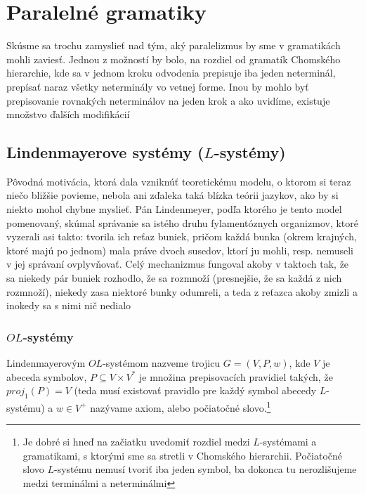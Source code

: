 \chapter{Paralelné gramatiky}

Skúsme sa trochu zamyslieť nad tým, aký paralelizmus by sme v
gramatikách mohli zaviesť. Jednou z možností by bolo, na rozdiel
od gramatík Chomského hierarchie, kde sa v jednom kroku odvodenia
prepisuje iba jeden neterminál, prepísať naraz všetky neterminály
vo vetnej forme. Inou by mohlo byť prepisovanie rovnakých
neterminálov na jeden krok a ako uvidíme, existuje množstvo
ďalších modifikácií

\section{Lindenmayerove systémy ($L$-systémy)}

\begin{motiv}
    Pôvodná motivácia, ktorá dala vzniknúť teoretickému modelu, o
    ktorom si teraz niečo bližšie povieme, nebola ani zďaleka taká
    blízka teórii jazykov, ako by si niekto mohol chybne myslieť. Pán
    Lindenmeyer, podľa ktorého je tento model pomenovaný, skúmal
    správanie sa istého druhu fylamentóznych organizmov, ktoré
    vyzerali asi takto: tvorila ich reťaz buniek, pričom každá bunka
    (okrem krajných, ktoré majú po jednom) mala práve dvoch susedov,
    ktorí ju mohli, resp. nemuseli v jej správaní ovplyvňovať. Celý
    mechanizmus fungoval akoby v taktoch tak, že sa niekedy pár buniek
    rozhodlo, že sa rozmnoží (presnejšie, že sa každá z nich
    rozmnoží), niekedy zasa niektoré bunky odumreli, a teda z reťazca
    akoby zmizli a inokedy sa s nimi nič nedialo
\end{motiv}

\subsection{$OL$-systémy}

\begin{definicia}[$OL$-systém]
    Lindenmayerovým $OL$-systémom nazveme
    trojicu $G=(V,P,w)$, kde $V$ je abeceda symbolov,
    $P\subseteq V\times V^{*}$ je množina prepisovacích
    pravidiel takých, že $proj_{1}(P)=V$ 
    (teda musí existovať pravidlo pre každý symbol abecedy $L$-systému)
    a $w\in V^{+}$ nazývame axiom, alebo
    počiatočné slovo.\footnote{Je dobré si hneď na začiatku uvedomiť
        rozdiel medzi $L$-systémami a gramatikami, s ktorými sme sa
        stretli v Chomského hierarchii. Počiatočné slovo
        $L$-systému nemusí tvoriť iba jeden symbol, ba dokonca tu
        nerozlišujeme medzi terminálmi a neterminálmi}
\end{definicia}

